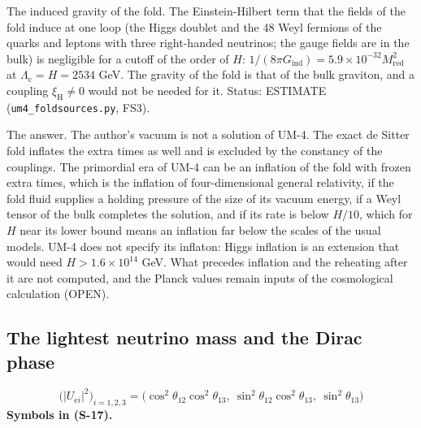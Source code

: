 \documentclass[
  10pt,
]{article}
\begin{document}
The induced gravity of the fold. The Einstein-Hilbert term that the
fields of the fold induce at one loop (the Higgs doublet and the 48 Weyl
fermions of the quarks and leptons with three right-handed neutrinos;
the gauge fields are in the bulk) is negligible for a cutoff of the
order of \(H\):
\(1/(8\pi G_{\mathrm{ind}}) = 5.9\times10^{-32}M_{\mathrm{red}}^2\) at
\(\Lambda_{\mathrm{c}} = H = 2534\) GeV. The gravity of the fold is that
of the bulk graviton, and a coupling \(\xi_{\mathrm{H}} \ne 0\) would
not be needed for it. Status: ESTIMATE (\texttt{um4\_foldsources.py},
FS3).

The answer. The author's vacuum is not a solution of UM-4. The exact de
Sitter fold inflates the extra times as well and is excluded by the
constancy of the couplings. The primordial era of UM-4 can be an
inflation of the fold with frozen extra times, which is the inflation of
four-dimensional general relativity, if the fold fluid supplies a
holding pressure of the size of its vacuum energy, if a Weyl tensor of
the bulk completes the solution, and if its rate is below \(H/10\),
which for \(H\) near its lower bound means an inflation far below the
scales of the usual models. UM-4 does not specify its inflaton: Higgs
inflation is an extension that would need \(H > 1.6\times10^{14}\) GeV.
What precedes inflation and the reheating after it are not computed, and
the Planck values remain inputs of the cosmological calculation (OPEN).

\hypertarget{the-lightest-neutrino-mass-and-the-dirac-phase}{%
\subsection{The lightest neutrino mass and the Dirac
phase}\label{the-lightest-neutrino-mass-and-the-dirac-phase}}

\[
\big(\lvert U_{\mathrm{e}i}\rvert^2\big)_{i = 1, 2, 3} = \big(\cos^2\theta_{12}\cos^2\theta_{13},\ \sin^2\theta_{12}\cos^2\theta_{13},\ \sin^2\theta_{13}\big) \tag{S-17}
\] \textbf{Symbols in (S-17).}
\end{document}

